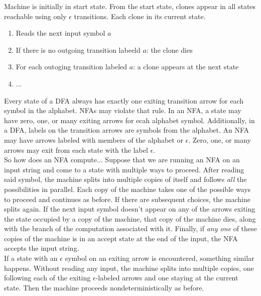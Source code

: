 \documentclass{article}
\theoremstyle{definition}
\begin{document}
Machine is initially in start state. From the start state, clones appear in all states reachable using only $\epsilon$ transitions. Each clone in its current state. 
\begin{enumerate}
  \item Reads the next input symbol $a$ 
  \item If there is no outgoing transition labeeld $a$: the clone dies 
  \item For each outoging transition labeled $a$: a clone appears at the next state 
  \item ...
\end{enumerate}

Every state of a DFA always has exactly one exiting transition arrow for each symbol in the alphabet. NFAs may violate that rule. In an NFA, a state may have zero, one, or many exiting arrows for ecah alphabet symbol. Additionally, in a DFA, labels on the transition arrows are symbols from the alphabet. An NFA may have arrows labeled with members of the alphabet or $\epsilon$. Zero, one, or many arrows may exit from each state with the label $\epsilon$. \\ 

So how does an NFA compute$\dots$ Suppose that we are running an NFA on an input string and come to a state with multiple ways to proceed. After reading said symbol, the machine splits into multiple copies of itself and follows \emph{all} the possibilities in parallel. Each copy of the machine takes one of the possible ways to proceed and continues as before. If there are subsequent choices, the machine splits again. If the next input symbol doesn't appear on any of the arrows exiting the state occupied by a copy of the machine, that copy of the machine dies, along with the branch of the computation associated with it. Finally, if \emph{any one} of these copies of the machine is in an accept state at the end of the input, the NFA accepts the input string. \\ 

If a state with an $\epsilon$ symbol on an exiting arrow is encountered, something similar happens. Without reading any input, the machine splits into multiple copies, one following each of the exiting $\epsilon$-labeled arrows and one staying at the current state. Then the machine proceeds nondeterministically as before. \\ 
\end{document}
